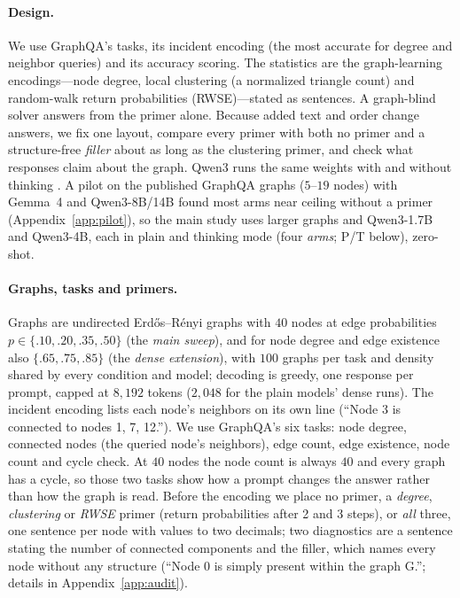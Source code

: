 \documentclass[11pt]{article}
\begin{document}
\paragraph{Design.} We use GraphQA's tasks, its incident encoding (the most accurate for degree and neighbor queries) and its accuracy scoring. The statistics are the graph-learning encodings---node degree, local clustering (a normalized triangle count) and random-walk return probabilities (RWSE)---stated as sentences. A graph-blind solver answers from the primer alone. Because added text and order change answers, we fix one layout, compare every primer with both no primer and a structure-free \emph{filler} about as long as the clustering primer, and check what responses claim about the graph. Qwen3 runs the same weights with and without thinking \citep{qwen2025qwen3}. A pilot on the published GraphQA graphs ($5$--$19$ nodes) with Gemma~4 and Qwen3-8B/14B found most arms near ceiling without a primer (Appendix~\ref{app:pilot}), so the main study uses larger graphs and Qwen3-1.7B and Qwen3-4B, each in plain and thinking mode (four \emph{arms}; P/T below), zero-shot.

\paragraph{Graphs, tasks and primers.} Graphs are undirected Erd\H{o}s--R\'enyi graphs \citep{gilbert1959random} with $40$ nodes at edge probabilities $p\in\{.10,.20,.35,.50\}$ (the \emph{main sweep}), and for node degree and edge existence also $\{.65,.75,.85\}$ (the \emph{dense extension}), with $100$ graphs per task and density shared by every condition and model; decoding is greedy, one response per prompt, capped at $8{,}192$ tokens ($2{,}048$ for the plain models' dense runs). %
The incident encoding lists each node's neighbors on its own line (``Node 3 is connected to nodes 1, 7, 12.''). We use GraphQA's six tasks: node degree, connected nodes (the queried node's neighbors), edge count, edge existence, node count and cycle check. At $40$ nodes the node count is always $40$ and every graph has a cycle, %
so those two tasks show how a prompt changes the answer rather than how the graph is read. Before the encoding we place no primer, a \emph{degree}, \emph{clustering} or \emph{RWSE} primer (return probabilities after 2 and 3 steps), or \emph{all} three, one sentence per node with values to two decimals; two diagnostics are a sentence stating the number of connected components and the filler, which names every node without any structure (``Node 0 is simply present within the graph G.''; details in Appendix~\ref{app:audit}).
\end{document}
